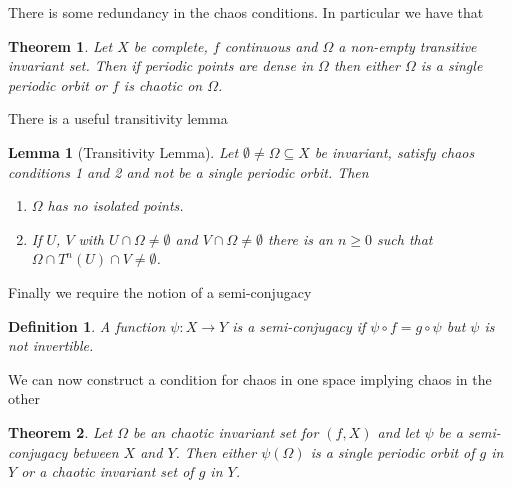 \documentclass{article}
\newtheorem{theorem}{Theorem}
\newtheorem{lemma}{Lemma}
\newtheorem{definition}{Definition}
\begin{document}
There is some redundancy in the chaos conditions. In particular we have that 

\begin{theorem}
    Let $X$ be complete, $f$ continuous and $\Omega$ a non-empty transitive invariant set. Then if 
    periodic points are dense in $\Omega$ then either $\Omega$ is a single periodic orbit or $f$ 
    is chaotic on $\Omega$.
\end{theorem}

There is a useful transitivity lemma 

\begin{lemma}[Transitivity Lemma]
    Let $\emptyset \neq \Omega \subseteq X$ be invariant, satisfy chaos conditions 1 and 2 and not 
    be a single periodic orbit. Then 

    \begin{enumerate}
        \item $\Omega$ has no isolated points.
        \item If $U$, $V$ with $U \cap \Omega \neq \emptyset$ and $V \cap \Omega \neq \emptyset$ 
        there is an $n \geq 0$ such that $\Omega \cap T^n(U) \cap V \neq \emptyset$. 
    \end{enumerate}
\end{lemma}

Finally we require the notion of a semi-conjugacy 

\begin{definition}
    A function $\psi:X \rightarrow Y$ is a semi-conjugacy if $\psi \circ f = g \circ \psi$ but 
    $\psi$ is not invertible.
\end{definition}

We can now construct a condition for chaos in one space implying chaos in the other

\begin{theorem}
    Let $\Omega$ be an chaotic invariant set for $(f,X)$ and let $\psi$ be a semi-conjugacy between 
    $X$ and $Y$. Then either $\psi(\Omega)$ is a single periodic orbit of $g$ in $Y$ or a chaotic 
    invariant set of $g$ in $Y$.
\end{theorem}
\end{document}
